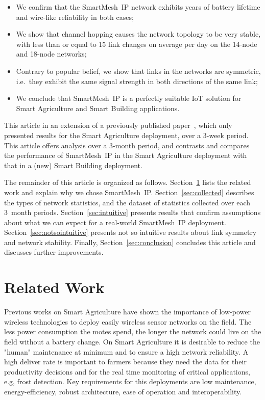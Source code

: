 \documentclass{elsarticle}
\newcommand{\smip}                {SmartMesh~IP\xspace}
\newcommand{\building}            {Smart Building\xspace}
\newcommand{\agri}                {Smart Agriculture\xspace}
\begin{document}
\begin{itemize}
    \item We confirm that the \smip network exhibits years of battery lifetime and wire-like reliability in both cases;
    \item We show that channel hopping causes the network topology to be very stable, with less than or equal to 15 link changes on average per day on the 14-node and 18-node networks;
    \item Contrary to popular belief, we show that links in the networks are symmetric, i.e.~they exhibit the same signal strength in both directions of the same link;
    \item We conclude that \smip is a perfectly suitable IoT solution for \agri and \building applications.
\end{itemize}


This article in an extension of a previously published paper~\cite{brun16intuitive}, which only presented results for the \agri deployment, over a 3-week period.
This article offers analysis over a 3-month period, and contrasts and compares the performance of \smip in the \agri deployment with that in a (new) \building deployment.


The remainder of this article is organized as follows.
Section~\ref{sec:related} lists the related work and explain why we chose \smip.
Section~\ref{sec:collected} describes the types of network statistics, and the dataset of statistics collected over each 3~month periods.
Section~\ref{sec:intuitive} presents results that confirm assumptions about what we can expect for a real-world \smip deployment.
Section~\ref{sec:notsointuitive} presents not so intuitive results about link symmetry and network stability.
Finally, Section~\ref{sec:conclusion} concludes this article and discusses further improvements.

\section{Related Work}
\label{sec:related}

Previous works on \agri \cite{ojha2015wireless} have shown the importance of low-power wireless technologies to deploy easily wireless sensor networks on the field. The less power consumption the motes spend, the longer the network could live on the field without a battery change. On \agri it is desirable to reduce the "human" maintenance at minimum and to ensure a high network reliability. A high deliver rate is important to farmers because they need the data for their productivity decisions and for the real time monitoring of critical applications, e.g, frost detection. Key requirements for this deployments are low maintenance, energy-efficiency, robust architecture, ease of operation and interoperability.
\end{document}
